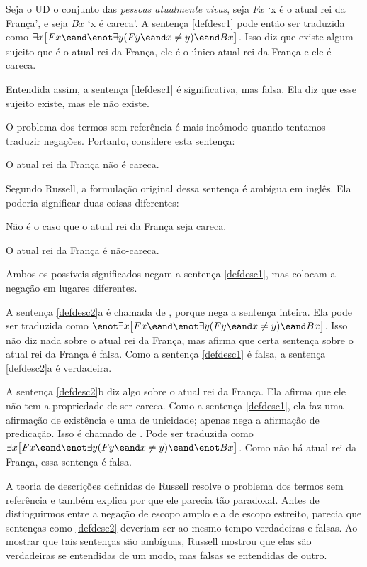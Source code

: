 Seja o UD o conjunto das \emph{pessoas atualmente vivas}, seja $Fx$ `x é o atual rei da França', e seja $Bx$ `x é careca'. A sentença \ref{defdesc1} pode então ser traduzida como $\exists x\bigl[Fx \eand \enot\exists y(Fy \eand x\neq y) \eand Bx\bigr]$. Isso diz que existe algum sujeito que é o atual rei da França, ele é o único atual rei da França e ele é careca.

Entendida assim, a sentença \ref{defdesc1} é significativa, mas falsa. Ela diz que esse sujeito existe, mas ele não existe.

O problema dos termos sem referência é mais incômodo quando tentamos traduzir negações. Portanto, considere esta sentença:
\begin{earg}
\item[\ex{defdesc2}] O atual rei da França não é careca.
\end{earg}
Segundo Russell, a formulação original dessa sentença é ambígua em inglês. Ela poderia significar duas coisas diferentes:
\begin{earg}
\item[\ref{defdesc2}a.] Não é o caso que o atual rei da França seja careca.
\item[\ref{defdesc2}b.] O atual rei da França é não-careca.
\end{earg}
Ambos os possíveis significados negam a sentença \ref{defdesc1}, mas colocam a negação em lugares diferentes.

A sentença \ref{defdesc2}a é chamada de , porque nega a sentença inteira. Ela pode ser traduzida como $\enot\exists x\bigl[Fx \eand \enot\exists y(Fy \eand x\neq y) \eand Bx\bigr]$. Isso não diz nada sobre o atual rei da França, mas afirma que certa sentença sobre o atual rei da França é falsa. Como a sentença \ref{defdesc1} é falsa, a sentença \ref{defdesc2}a é verdadeira.

A sentença \ref{defdesc2}b diz algo sobre o atual rei da França. Ela afirma que ele não tem a propriedade de ser careca. Como a sentença \ref{defdesc1}, ela faz uma afirmação de existência e uma de unicidade; apenas nega a afirmação de predicação. Isso é chamado de . Pode ser traduzida como $\exists x\bigl[Fx \eand \enot\exists y(Fy \eand x\neq y) \eand \enot Bx\bigr]$. Como não há atual rei da França, essa sentença é falsa.

A teoria de descrições definidas de Russell resolve o problema dos termos sem referência e também explica por que ele parecia tão paradoxal. Antes de distinguirmos entre a negação de escopo amplo e a de escopo estreito, parecia que sentenças como \ref{defdesc2} deveriam ser ao mesmo tempo verdadeiras e falsas. Ao mostrar que tais sentenças são ambíguas, Russell mostrou que elas são verdadeiras se entendidas de um modo, mas falsas se entendidas de outro.


